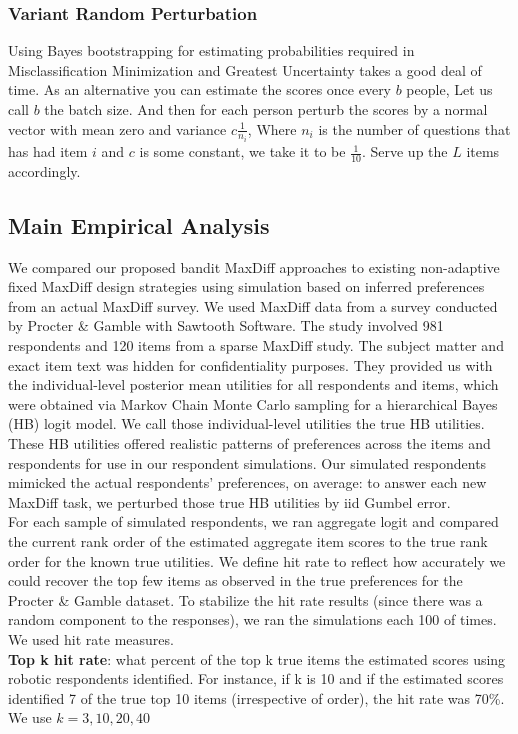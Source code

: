 \documentclass[nonblindrev]{informs3}
\begin{document}
\subsubsection{Variant Random Perturbation}
Using Bayes bootstrapping for estimating probabilities required in Misclassification Minimization and Greatest Uncertainty takes a good deal of time. As an alternative you can estimate the scores once every $b$ people, Let us call $b$ the batch size. And then for each person perturb the scores by a normal vector with mean zero and variance $c\frac{1}{n_i}$, Where $n_i$ is the number of questions that has had item $i$ and $c$ is some constant, we take it to be $\frac{1}{10}$. Serve up the $L$ items accordingly.   

\subsection{Main Empirical Analysis}
We compared our proposed bandit MaxDiff approaches to existing non-adaptive fixed MaxDiff design strategies using simulation based on inferred preferences from an actual MaxDiff survey. We used MaxDiff data from a survey conducted by Procter \& Gamble with Sawtooth Software. The study involved 981 respondents and 120 items from a sparse MaxDiff study. The subject matter and exact item text was hidden for confidentiality purposes. They provided us with the individual-level posterior mean utilities for all respondents and items, which were obtained via Markov Chain Monte Carlo sampling for a hierarchical Bayes (HB) logit model. We call those individual-level utilities the true HB utilities.  These HB utilities offered realistic patterns of preferences across the items and respondents for use in our respondent simulations.  Our simulated respondents mimicked the actual respondents' preferences, on average: to answer each new MaxDiff task, we perturbed those true HB utilities by iid Gumbel error.  \\
For each sample of simulated respondents, we ran aggregate logit and compared the current rank order of the estimated aggregate item scores to the true rank order for the known true utilities.  We define hit rate to reflect how accurately we could recover the top few items as observed in the true preferences for the Procter \& Gamble dataset.  To stabilize the hit rate results (since there was a random component to the responses), we ran the simulations each 100 of times. \\
We used hit rate measures.\\ \textbf{Top k hit rate}: what percent of the top k true items the estimated scores using robotic respondents identified. For instance, if k is 10 and if the estimated scores identified 7 of the true top 10 items (irrespective of order), the hit rate was 70\%. We use $k=3,10,20,40$
\end{document}
